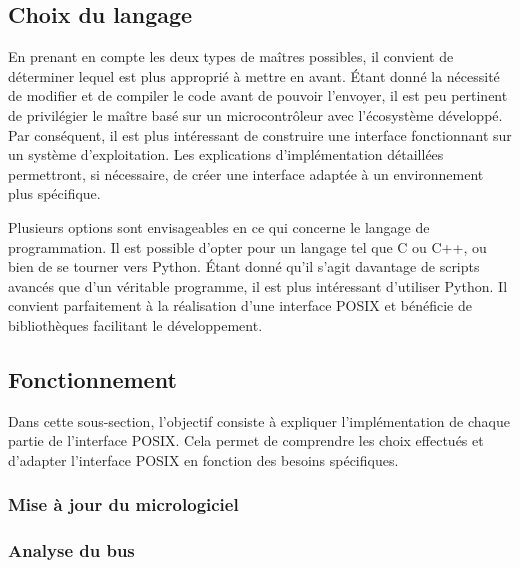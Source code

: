 \subsection{Choix du langage}

En prenant en compte les deux types de maîtres possibles, il convient de déterminer lequel est plus approprié à mettre en avant.
Étant donné la nécessité de modifier et de compiler le code avant de pouvoir l'envoyer, il est peu pertinent de privilégier le maître basé sur un microcontrôleur avec l'écosystème développé.
Par conséquent, il est plus intéressant de construire une interface fonctionnant sur un système d'exploitation. Les explications d'implémentation détaillées permettront, si nécessaire, de créer une interface adaptée à un environnement plus spécifique.

Plusieurs options sont envisageables en ce qui concerne le langage de programmation.
Il est possible d'opter pour un langage tel que C ou C++, ou bien de se tourner vers Python.
Étant donné qu'il s'agit davantage de scripts avancés que d'un véritable programme, il est plus intéressant d'utiliser Python.
Il convient parfaitement à la réalisation d'une interface POSIX et bénéficie de bibliothèques facilitant le développement.

\subsection{Fonctionnement}

Dans cette sous-section, l'objectif consiste à expliquer l'implémentation de chaque partie de l'interface POSIX.
Cela permet de comprendre les choix effectués et d'adapter l'interface POSIX en fonction des besoins spécifiques.

\subsubsection{Mise à jour du micrologiciel}


\subsubsection{Analyse du bus}

